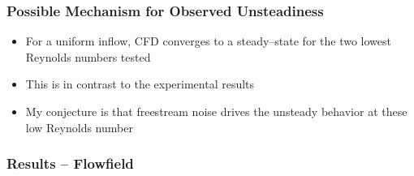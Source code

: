 \documentclass[compress,11pt]{beamer}
\begin{document}
\frame
{
  \frametitle{\scriptsize Possible Mechanism for Observed Unsteadiness}
  \begin{itemize}
    \item For a uniform inflow, CFD converges to a steady--state for the two lowest Reynolds numbers tested
    \item This is in contrast to the experimental results
    \item My conjecture is that freestream noise drives the unsteady behavior at these low Reynolds number
  \end{itemize}
}


\frame
{
  \frametitle{\scriptsize Results -- Flowfield}
  \centerline{}
}

\end{document}
